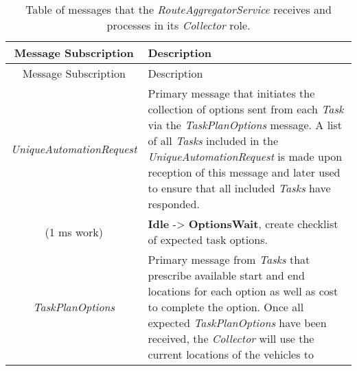 \begin{longtable}[]{@{}cl@{}}
\caption{Table of messages that the \emph{RouteAggregatorService}
receives and processes in its \emph{Collector} role.}\tabularnewline
\toprule
\begin{minipage}[b]{0.40\columnwidth}\centering\strut
Message Subscription\strut
\end{minipage} & \begin{minipage}[b]{0.55\columnwidth}\raggedright\strut
Description\strut
\end{minipage}\tabularnewline
\midrule
\endfirsthead
\toprule
\begin{minipage}[b]{0.40\columnwidth}\centering\strut
Message Subscription\strut
\end{minipage} & \begin{minipage}[b]{0.55\columnwidth}\raggedright\strut
Description\strut
\end{minipage}\tabularnewline
\midrule
\endhead
\begin{minipage}[t]{0.40\columnwidth}\centering\strut
\emph{UniqueAutomationRequest}\strut
\end{minipage} & \begin{minipage}[t]{0.55\columnwidth}\raggedright\strut
Primary message that initiates the collection of options sent from each
\emph{Task} via the \emph{TaskPlanOptions} message. A list of all
\emph{Tasks} included in the \emph{UniqueAutomationRequest} is made upon
reception of this message and later used to ensure that all included
\emph{Tasks} have responded.\strut
\end{minipage}\tabularnewline
\begin{minipage}[t]{0.40\columnwidth}\centering\strut
(1 ms work)\strut
\end{minipage} & \begin{minipage}[t]{0.55\columnwidth}\raggedright\strut
\textbf{Idle} -\textgreater{} \textbf{OptionsWait}, create checklist of
expected task options.\strut
\end{minipage}\tabularnewline
\begin{minipage}[t]{0.40\columnwidth}\centering\strut
\emph{TaskPlanOptions}\strut
\end{minipage} & \begin{minipage}[t]{0.55\columnwidth}\raggedright\strut
Primary message from \emph{Tasks} that prescribe available start and end
locations for each option as well as cost to complete the option. Once
all expected \emph{TaskPlanOptions} have been received, the
\emph{Collector} will use the current locations of the vehicles to

\end{minipage}
\end{longtable}
